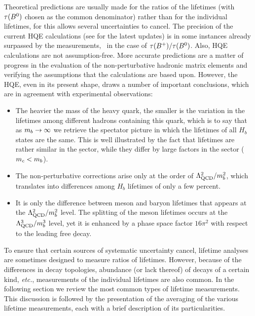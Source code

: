 Theoretical predictions are usually made for the ratios of the lifetimes
(with $\tau(B^0)$ chosen as the common denominator) rather than for the
individual lifetimes, for this allows several uncertainties to cancel.
The precision of the current HQE calculations (see
 for the latest updates)
is in some instances already surpassed by the measurements,
\eg\ in the case of $\tau(B^+)/\tau(B^0)$.  Also, HQE calculations are
not assumption-free.  More accurate predictions are a matter of progress
in the evaluation of the non-perturbative hadronic matrix elements and
verifying the assumptions that the calculations are based upon.
However, the HQE, even in its present shape, draws a number of important
conclusions, which are in agreement with experimental observations:
\begin{itemize}
\item The heavier the mass of the heavy quark, the smaller is the
  variation in the lifetimes among different hadrons containing this
  quark, which is to say that as $m_{b}\to\infty$ we retrieve the
  spectator picture in which the lifetimes of all $H_b$ states are the same.
   This is well illustrated by the fact that lifetimes are rather
   similar in the \b sector, while they differ by large factors
   in the  sector ($m_{c}<m_{b}$).
\item The non-perturbative corrections arise only at the order of
  $\Lambda_{\rm QCD}^2/m_{b}^2$, which translates into 
  differences among $H_b$ lifetimes of only a few percent.
\item It is only the difference between meson and baryon lifetimes that
  appears at the $\Lambda_{\rm QCD}^2/m_{b}^2$ level.  The splitting of the
  meson lifetimes occurs at the $\Lambda_{\rm QCD}^3/m_{b}^3$ level, yet it is
  enhanced by a phase space factor $16\pi^2$ with respect to the leading
  free \b decay.
\end{itemize}

To ensure that certain sources of systematic uncertainty cancel, 
lifetime analyses are sometimes designed to measure
ratios of lifetimes.  However, because of the differences in decay
topologies, abundance (or lack thereof) of decays of a certain kind,
{\em etc.}, measurements of the individual lifetimes are also 
common.  In the following section we review the most common
types of lifetime measurements.  This discussion is followed by the
presentation of the averaging of the various lifetime measurements, each
with a brief description of its particularities.


